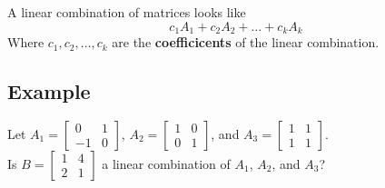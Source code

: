 A linear combination of matrices looks like
\[c_1A_1+c_2A_2+\dots+c_kA_k\]
Where $c_1, c_2, \dots, c_k$ are the \textbf{coefficicents} of the linear combination.

\subsection*{Example}
Let $A_1=\begin{bmatrix}
        0  & 1 \\
        -1 & 0
    \end{bmatrix}$, $A_2=\begin{bmatrix}
        1 & 0 \\
        0 & 1
    \end{bmatrix}$, and $A_3=\begin{bmatrix}
        1 & 1 \\
        1 & 1
    \end{bmatrix}$. \\
Is $B=\begin{bmatrix}
        1 & 4 \\
        2 & 1
    \end{bmatrix}$ a linear combination of $A_1$, $A_2$, and $A_3$?

